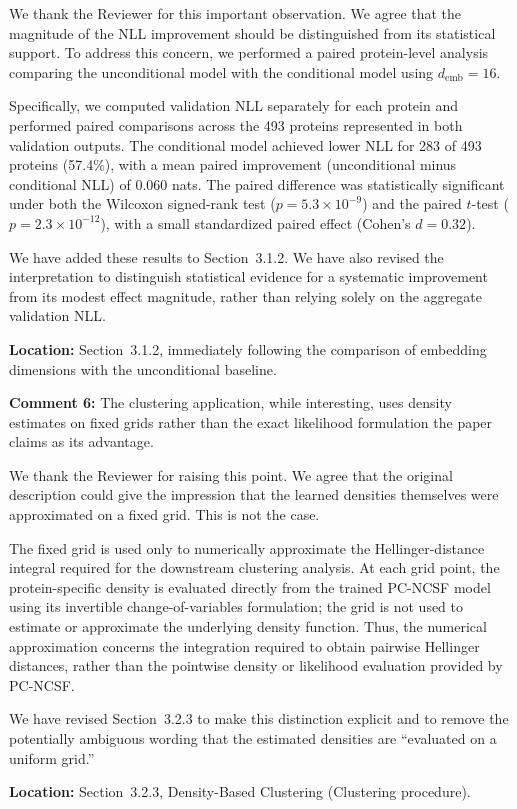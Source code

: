 \documentclass[a4paper,11pt]{article}
\newcommand{\reviewercomment}[2]{%
    \begin{reviewerscomment}
        \textbf{Comment #1:} #2
    \end{reviewerscomment}
}
\newcommand{\response}[1]{%
    \begin{myresponse}
        #1
    \end{myresponse}
    \vspace{5mm}
}
\begin{document}
\response{
We thank the Reviewer for this important observation. We agree that the
magnitude of the NLL improvement should be distinguished from its statistical
support. To address this concern, we performed a paired protein-level analysis
comparing the unconditional model with the conditional model using
$d_{\mathrm{emb}}=16$.

Specifically, we computed validation NLL separately for each protein and
performed paired comparisons across the 493 proteins represented in both
validation outputs. The conditional model achieved lower NLL for 283 of
493 proteins (57.4\%), with a mean paired improvement (unconditional minus
conditional NLL) of 0.060 nats. The paired difference was statistically
significant under both the Wilcoxon signed-rank test
($p = 5.3\times10^{-9}$) and the paired $t$-test
($p = 2.3\times10^{-12}$), with a small standardized paired effect
(Cohen's $d = 0.32$).

We have added these results to Section~3.1.2. We have also revised the
interpretation to distinguish statistical evidence for a systematic
improvement from its modest effect magnitude, rather than relying solely on
the aggregate validation NLL.

\textbf{Location:} Section~3.1.2, immediately following the comparison of
embedding dimensions with the unconditional baseline.
}



\reviewercomment{6}{
The clustering application, while interesting, uses density estimates on
fixed grids rather than the exact likelihood formulation the paper claims
as its advantage.
}

\response{
We thank the Reviewer for raising this point. We agree that the original
description could give the impression that the learned densities themselves
were approximated on a fixed grid. This is not the case.

The fixed grid is used only to numerically approximate the Hellinger-distance
integral required for the downstream clustering analysis. At each grid point,
the protein-specific density is evaluated directly from the trained PC-NCSF
model using its invertible change-of-variables formulation; the grid is not
used to estimate or approximate the underlying density function. Thus, the
numerical approximation concerns the integration required to obtain pairwise
Hellinger distances, rather than the pointwise density or likelihood
evaluation provided by PC-NCSF.

We have revised Section~3.2.3 to make this distinction explicit and to remove
the potentially ambiguous wording that the estimated densities are
``evaluated on a uniform grid.''

\textbf{Location:} Section~3.2.3, Density-Based Clustering
(Clustering procedure).
}
\end{document}
